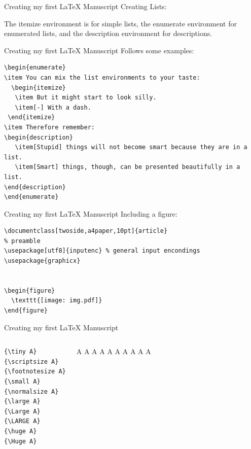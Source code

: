 \begin{frame}[fragile]{Creating my first \LaTeX{} Manuscript}
Creating Lists:

The itemize environment is for simple lists, the enumerate environment for enumerated lists, and the description environment for descriptions.
\end{frame}

\begin{frame}[fragile]{Creating my first \LaTeX{} Manuscript}
Follows some examples:
\scriptsize
\begin{verbatim}
\begin{enumerate}
\item You can mix the list environments to your taste:
  \begin{itemize}
   \item But it might start to look silly.
   \item[-] With a dash.
 \end{itemize}
\item Therefore remember:
\begin{description}
   \item[Stupid] things will not become smart because they are in a list.
   \item[Smart] things, though, can be presented beautifully in a list.
\end{description}
\end{enumerate}
\end{verbatim}
\end{frame}

\begin{frame}[fragile]{Creating my first \LaTeX{} Manuscript}
Including a figure:
\footnotesize
\begin{verbatim}
\documentclass[twoside,a4paper,10pt]{article}
% preamble
\usepackage[utf8]{inputenc} % general input encondings
\usepackage{graphicx}


\begin{figure}
  \texttt{[image: img.pdf]}
\end{figure}

\end{verbatim}
\end{frame}

\begin{frame}[fragile]{Creating my first \LaTeX{} Manuscript}
\begin{columns}[c]
\column{1.5in}
\begin{verbatim}
{\tiny A}
{\scriptsize A}
{\footnotesize A}
{\small A}
{\normalsize A}
{\large A}
{\Large A}
{\LARGE A}
{\huge A}
{\Huge A}
\end{verbatim}
\column{2.5in}
{\tiny A}
{\scriptsize A}
{\footnotesize A}
{\small A}
{\normalsize A}
{\large A}
{\Large A}
{\LARGE A}
{\huge A}
{\Huge A}
\end{columns}
\end{frame}


